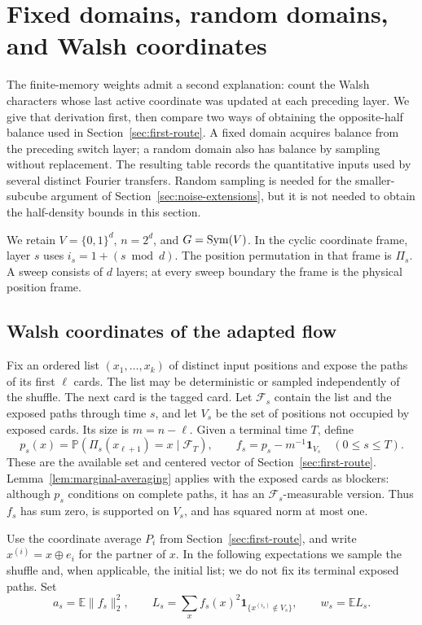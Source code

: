 \section{Fixed domains, random domains, and Walsh coordinates}
\label{mart:section}

The finite-memory weights admit a second explanation: count the Walsh
characters whose last active coordinate was updated at each preceding
layer. We give that derivation first, then compare two ways of obtaining
the opposite-half balance used in Section~\ref{sec:first-route}. A fixed
domain acquires balance from the preceding switch layer; a random domain
also has balance by sampling without replacement. The resulting table
records the quantitative inputs used by several distinct Fourier
transfers. Random sampling is needed for the smaller-subcube argument of
Section~\ref{sec:noise-extensions}, but it is not needed to obtain the
half-density bounds in this section.

We retain $V=\{0,1\}^d$, $n=2^d$, and $G=\operatorname{Sym}(V)$. In the cyclic
coordinate frame, layer $s$ uses $i_s=1+(s\bmod d)$. The position
permutation in that frame is $\Pi_s$. A sweep consists of $d$ layers;
at every sweep boundary the frame is the physical position frame.

\subsection{Walsh coordinates of the adapted flow}
\label{mart:flow-section}

Fix an ordered list $(x_1,\ldots,x_k)$ of distinct input positions and expose the paths of
its first $\ell$ cards.  The list may be deterministic or sampled
independently of the shuffle.  The next card is the tagged card.  Let
$\mathcal F_s$ contain the list and the exposed paths through time $s$,
and let $V_s$ be the set of positions not occupied by exposed cards.
Its size is $m=n-\ell$.  Given a terminal time $T$, define
\[
 p_s(x)=\mathbb P(\Pi_s(x_{\ell+1})=x\mid\mathcal F_T),\qquad
 f_s=p_s-m^{-1}\mathbf1_{V_s}\quad(0\le s\le T).
\]
These are the available set and centered vector of
Section~\ref{sec:first-route}. Lemma~\ref{lem:marginal-averaging}
applies with the exposed cards as blockers: although $p_s$ conditions on
complete paths, it has an $\mathcal F_s$-measurable version. Thus $f_s$
has sum zero, is supported on $V_s$, and has squared norm at most one.

Use the coordinate average $P_i$ from Section~\ref{sec:first-route},
and write $x^{(i)}=x\oplus e_i$ for the partner of $x$.  In the following
expectations we sample the shuffle and, when applicable, the initial
list; we do not fix its terminal exposed paths.  Set
\[
 a_s=\mathbb E\|f_s\|_2^2,\qquad
 L_s=\sum_x f_s(x)^2\mathbf1_{\{x^{(i_s)}\notin V_s\}},
 \qquad w_s=\mathbb E L_s.
\]

